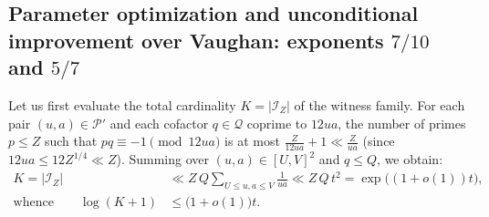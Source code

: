 \documentclass[11pt, a4paper]{article}
\theoremstyle{plain}
\theoremstyle{definition}
\begin{document}
\subsection{Parameter optimization and unconditional improvement over Vaughan: exponents $7/10$ and $5/7$}\label{subsec:exposants_7_10_et_5_7}
Let us first evaluate the total cardinality $K = |\mathcal{I}_Z|$ of the witness family. For each pair $(u,a) \in \mathcal{P}'$ and each cofactor $q \in \mathcal{Q}$ coprime to $12ua$, the number of primes $p \le Z$ such that $pq \equiv -1 \pmod{12ua}$ is at most $\frac{Z}{12ua} + 1 \ll \frac{Z}{ua}$ (since $12ua \le 12Z^{1/4} \ll Z$). Summing over $(u,a) \in [U, V]^2$ and $q \le Q$, we obtain:
\begin{equation}\label{eq:cardinal_K}
\begin{split}
K = |\mathcal{I}_Z| &\ll Z\,Q \sum_{U \le u,a \le V} \frac{1}{ua} \ll Z\,Q\,t^2 = \exp\!\big((1 + o(1)) t\big), \\
\text{whence} \qquad \log(K+1) &\le \big(1 + o(1)\big) t.
\end{split}
\end{equation}
\end{document}
